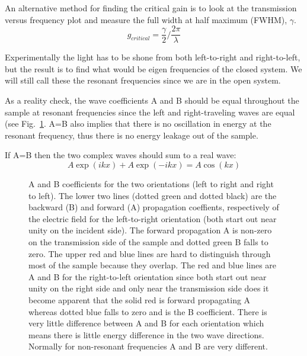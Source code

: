 An alternative method for finding the critical gain is to look at the transmission versus frequency plot and measure the full width at half maximum (FWHM), $\gamma$.
\begin{equation}
g_{critical} = \frac{\gamma}{2} / \frac{2 \pi}{ \lambda }
\end{equation}

Experimentally the light has to be shone from both left-to-right and right-to-left, but the result is to find what would be eigen frequencies of the closed system.  We will still call these the resonant frequencies since we are in the open system.

As a reality check, the wave coefficients A and B should be equal throughout the sample at resonant frequencies since the left and right-traveling waves are equal (see Fig.~\ref{fig:ABLRRLlog}.  A=B also implies that there is no oscillation in energy at the resonant frequency, thus there is no energy leakage out of the sample.

If A=B then the two complex waves should sum to a real wave:
\begin{equation}
A \exp(i k x)+A \exp(-i k x) = A \cos(k x)
\end{equation}

\begin{figure}
\vskip -0.5cm
\centerline{}
\vskip -0.5cm
\caption[A and B coefficients for the two orientations (left to right and right to left).]{A and B coefficients for the two orientations (left to right and right to left). The lower two lines (dotted green and dotted black) are the backward (B) and forward (A) propagation coeffients, respectively of the electric field for the left-to-right orientation (both start out near unity on the incident side). The forward propagation A is non-zero on the transmission side of the sample and dotted green B falls to zero. The upper red and blue lines are hard to distinguish through most of the sample because they overlap. The red and blue lines are A and B for the right-to-left orientation since both start out near unity on the right side and only near the transmission side does it become apparent that the solid red is forward propagating A whereas dotted blue falls to zero and is the B coefficient. There is very little difference between A and B for each orientation which means there is little energy difference in the two wave directions. Normally for non-resonant frequencies A and B are very different.}
\label{fig:ABLRRLlog}
\end{figure}


